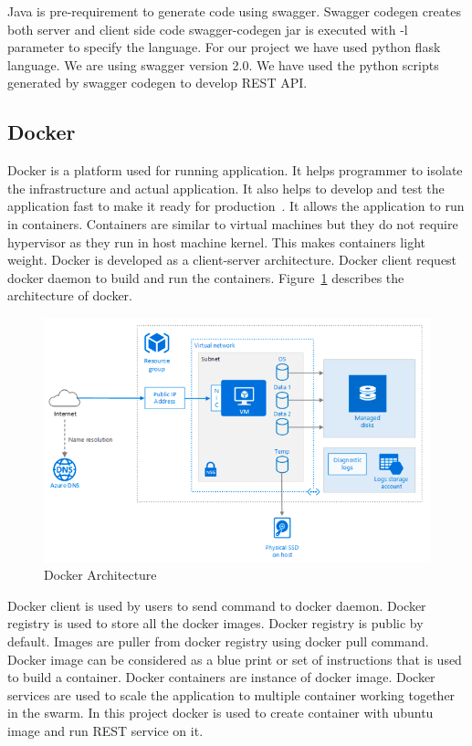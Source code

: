 Java is pre-requirement to generate code using swagger. Swagger codegen creates
both server and client side code swagger-codegen jar is executed with -l
parameter to specify the language. For our project we have used python flask
language. We are using swagger version 2.0. We have used the python scripts
generated by swagger codegen to develop REST API.


\subsection{Docker}
Docker is a platform used for running application. It helps programmer to
isolate the infrastructure and actual application. It also helps to develop and
test the application fast to make it ready for
production~\cite{hid-sp18-502-docker}. It allows the
application to run in containers. Containers are similar to virtual machines
but they do not require hypervisor as they run in host machine kernel. This
makes containers light weight. Docker is developed as a client-server
architecture\cite{hid-sp18-502-docker}. Docker client request docker daemon to
build and run the
containers. Figure~\ref{f:docker} describes the architecture of
docker.

\begin{figure}[!ht]
  \centering\includegraphics[width=\columnwidth]{image/docker-architecture.PNG}
  \caption{Docker Architecture}\label{f:docker}
\end{figure}

Docker client is used by users to send command to docker daemon. Docker
registry is used to store all the docker images\cite{hid-sp18-502-docker}.
Docker registry is public by
default. Images are puller from docker registry using docker pull command.
Docker image can be considered as a blue print or set of instructions that is
used to build a container\cite{hid-sp18-502-docker}. Docker containers are
instance of docker image. Docker services are used to scale the application to
multiple container working
together in the swarm\cite{hid-sp18-502-docker}. In this project docker is used to create container with
ubuntu image and run REST service on it.

